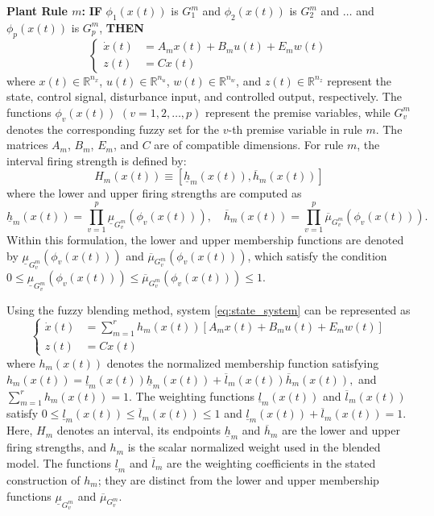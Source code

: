 \documentclass[preprint,review,fleqn,sort&compress,3p]{elsarticle}
\theoremstyle{definition} %
\theoremstyle{definition}%
\begin{document}
\textbf{Plant Rule $m$:} 
\textbf{IF} $\phi_1(x(t))$ is $G^{m}_1$ and $\phi_2(x(t))$ is $G^{m}_2$ and $\ldots$ and $\phi_p(x(t))$ is $G^{m}_p$, \textbf{THEN}
\begin{equation}\label{eq:state_system}
	\left\{
	\begin{aligned}
		\dot{x}(t) &= A_{m} x(t) + B_{m} u(t) + E_{m} w(t) \\
		z(t) &= C x(t)
	\end{aligned}
	\right.
\end{equation}
where $x(t)\in\mathbb{R}^{n_x}$, $u(t)\in\mathbb{R}^{n_u}$,
$w(t)\in\mathbb{R}^{n_w}$, and $z(t)\in\mathbb{R}^{n_z}$
represent the state, control signal, disturbance input, and controlled output, respectively.
The functions $\phi_v(x(t))$ $(v=1,2,\ldots,p)$ represent the premise variables, while $G_v^m$ denotes the corresponding fuzzy set for the $v$-th premise variable in rule $m$.
The matrices $A_m$, $B_m$, $E_m$, and $C$ are of compatible dimensions.
For rule $m$, the interval firing strength is defined by:
\begin{equation}
	H_m(x(t)) \equiv \left[ \underline{h}_m(x(t)), \overline{h}_m(x(t)) \right]
\end{equation} 
where the lower and upper firing strengths are computed as
\begin{equation}
	\underline{h}_m(x(t)) = \prod_{v=1}^{p} \underline{\mu}_{G^m_{v}}(\phi_v(x(t))),
	\quad
	\overline{h}_m(x(t)) = \prod_{v=1}^{p} \overline{\mu}_{G^m_{v}}(\phi_v(x(t))).
\end{equation}
Within this formulation, the lower and upper membership functions are denoted by $\underline{\mu}_{G^m_{v}}(\phi_v(x(t)))$ and $\overline{\mu}_{G^m_{v}}(\phi_v(x(t)))$, which satisfy the condition $0 \le \underline{\mu}_{G^m_{v}}(\phi_v(x(t))) \le \overline{\mu}_{G^m_{v}}(\phi_v(x(t))) \le 1$.

Using the fuzzy blending method, system \eqref{eq:state_system} can be represented as
\begin{equation}
	\label{eq:global_system}
	\left\{
	\begin{aligned}
		\dot{x}(t) &= \sum_{m=1}^{r} h_m(x(t))
		\left[ 
		A_{m} x(t) + B_{m} u(t) + E_{m} w(t)
		\right]  \\
		z(t) &= C x(t)
	\end{aligned}
	\right.
\end{equation}
where $h_m(x(t))$ denotes the normalized membership function satisfying
$
h_m(x(t))
=
\underline{l}_m(x(t))\underline{h}_m(x(t))
+
\overline{l}_m(x(t))\overline{h}_m(x(t)),
$
and
$\sum_{m=1}^{r}h_m(x(t))=1$.
The weighting functions $\underline{l}_m(x(t))$ and
$\overline{l}_m(x(t))$ satisfy
$0\leq\underline{l}_m(x(t))
\leq\overline{l}_m(x(t))\leq1$
and
$\underline{l}_m(x(t))+\overline{l}_m(x(t))=1$.
Here, $H_m$ denotes an interval, its endpoints $\underline h_m$ and $\overline h_m$ are the lower and upper firing strengths, and $h_m$ is the scalar normalized weight used in the blended model. The functions $\underline l_m$ and $\overline l_m$ are the weighting coefficients in the stated construction of $h_m$; they are distinct from the lower and upper membership functions $\underline\mu_{G_v^m}$ and $\overline\mu_{G_v^m}$.
\end{document}
